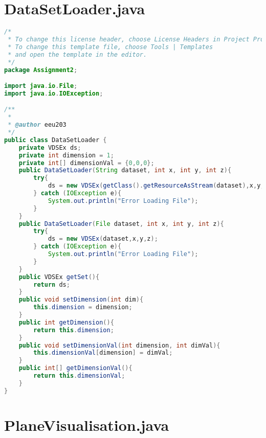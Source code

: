 \documentclass[pdftex,a4paper,10pt,titlepage]{article}
\begin{document}
\section{DataSetLoader.java}

\begin{lstlisting}[language=java, breaklines=true]
/*
 * To change this license header, choose License Headers in Project Properties.
 * To change this template file, choose Tools | Templates
 * and open the template in the editor.
 */
package Assignment2;

import java.io.File;
import java.io.IOException;

/**
 *
 * @author eeu203
 */
public class DataSetLoader {
    private VDSEx ds;
    private int dimension = 1;
    private int[] dimensionVal = {0,0,0};
    public DataSetLoader(String dataset, int x, int y, int z){
        try{
            ds = new VDSEx(getClass().getResourceAsStream(dataset),x,y,z);   
        } catch (IOException e){
            System.out.println("Error Loading File");
        }
    }
    public DataSetLoader(File dataset, int x, int y, int z){
        try{
            ds = new VDSEx(dataset,x,y,z);   
        } catch (IOException e){
            System.out.println("Error Loading File");
        }
    }
    public VDSEx getSet(){
        return ds;
    }
    public void setDimension(int dim){
        this.dimension = dimension;
    }
    public int getDimension(){
        return this.dimension;
    }
    public void setDimensionVal(int dimension, int dimVal){
        this.dimensionVal[dimension] = dimVal;
    }
    public int[] getDimensionVal(){
        return this.dimensionVal;
    }
}

\end{lstlisting}


\section{PlaneVisualisation.java}
\end{document}
